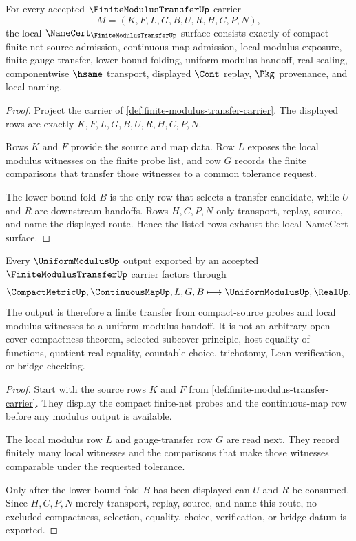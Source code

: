 \begin{theorem}
\label{thm:finite-modulus-transfer-obligations}
For every accepted $\FiniteModulusTransferUp$ carrier
$$
M=(K,F,L,G,B,U,R,H,C,P,N),
$$
the local $\NameCert_{\FiniteModulusTransferUp}$ surface consists exactly of compact finite-net source admission, continuous-map admission, local modulus exposure, finite gauge transfer, lower-bound folding, uniform-modulus handoff, real sealing, componentwise $\hsame$ transport, displayed $\Cont$ replay, $\Pkg$ provenance, and local naming.
\end{theorem}
\begin{proof}
Project the carrier of \autoref{def:finite-modulus-transfer-carrier}. The displayed rows are exactly $K,F,L,G,B,U,R,H,C,P,N$.

Rows $K$ and $F$ provide the source and map data. Row $L$ exposes the local modulus witnesses on the finite probe list, and row $G$ records the finite comparisons that transfer those witnesses to a common tolerance request.

The lower-bound fold $B$ is the only row that selects a transfer candidate, while $U$ and $R$ are downstream handoffs. Rows $H,C,P,N$ only transport, replay, source, and name the displayed route. Hence the listed rows exhaust the local NameCert surface.
\end{proof}

\begin{theorem}
\label{thm:finite-modulus-transfer-handoff}
Every $\UniformModulusUp$ output exported by an accepted $\FiniteModulusTransferUp$ carrier factors through
$$
\CompactMetricUp,\ContinuousMapUp,L,G,B \longmapsto \UniformModulusUp,\RealUp .
$$
The output is therefore a finite transfer from compact-source probes and local modulus witnesses to a uniform-modulus handoff. It is not an arbitrary open-cover compactness theorem, selected-subcover principle, host equality of functions, quotient real equality, countable choice, trichotomy, Lean verification, or bridge checking.
\end{theorem}
\begin{proof}
Start with the source rows $K$ and $F$ from \autoref{def:finite-modulus-transfer-carrier}. They display the compact finite-net probes and the continuous-map row before any modulus output is available.

The local modulus row $L$ and gauge-transfer row $G$ are read next. They record finitely many local witnesses and the comparisons that make those witnesses comparable under the requested tolerance.

Only after the lower-bound fold $B$ has been displayed can $U$ and $R$ be consumed. Since $H,C,P,N$ merely transport, replay, source, and name this route, no excluded compactness, selection, equality, choice, verification, or bridge datum is exported.
\end{proof}

